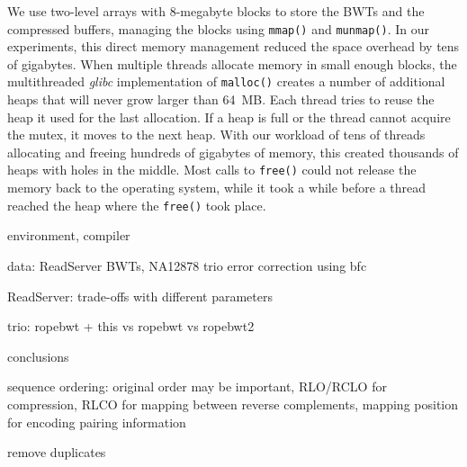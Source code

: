 \documentclass[smallabstract,smallcaptions]{dccpaper}
\newcommand{\BWT}{\textsf{BWT}}
\begin{document}
We use two-level arrays with 8\nobreakdash-megabyte blocks to store the \BWT{}s and the compressed buffers, managing the blocks using \texttt{mmap()} and \texttt{munmap()}. In our experiments, this direct memory management reduced the space overhead by tens of gigabytes. When multiple threads allocate memory in small enough blocks, the multithreaded \emph{glibc} implementation of \texttt{malloc()} creates a number of additional heaps that will never grow larger than 64~MB. Each thread tries to reuse the heap it used for the last allocation. If a heap is full or the thread cannot acquire the mutex, it moves to the next heap. With our workload of tens of threads allocating and freeing hundreds of gigabytes of memory, this created thousands of heaps with holes in the middle. Most calls to \texttt{free()} could not release the memory back to the operating system, while it took a while before a thread reached the heap where the \texttt{free()} took place.



environment, compiler

data: ReadServer BWTs, NA12878 trio \cite{1000GP2015}
error correction using bfc \cite{Li2015}

ReadServer: trade-offs with different parameters

trio: ropebwt + this vs ropebwt vs ropebwt2



conclusions

sequence ordering: original order may be important, RLO/RCLO for compression, RLCO for mapping between reverse complements, mapping position for encoding pairing information

remove duplicates




\end{document}
